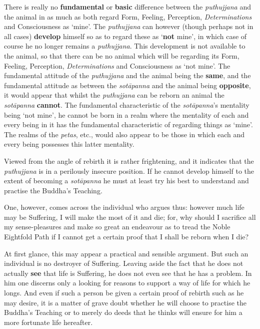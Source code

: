 There is really no \textbf{fundamental} or \textbf{basic} difference between the \emph{puthujjana} and the animal in as much as both regard Form, Feeling, Perception, \emph{Determinations} and Consciousness as `mine'. The \emph{puthujjana} can however (though perhaps not in all cases) \textbf{develop} himself so as to regard these as `\textbf{not} mine', in which case of course he no longer remains a \emph{puthujjana}. This development is not available to the animal, so that there can be no animal which will be regarding its Form, Feeling, Perception, \emph{Determinations} and Consciousness as `not mine'. The fundamental attitude of the \emph{puthujjana} and the animal being the \textbf{same}, and the fundamental attitude as between the \emph{sotāpanna} and the animal being \textbf{opposite}, it would appear that whilst the \emph{puthujjana} can be reborn an animal the \emph{sotāpanna} \textbf{cannot}. The fundamental characteristic of the \emph{sotāpanna}'s mentality being `not mine', he cannot be born in a realm where the mentality of each and every being in it has the fundamental characteristic of regarding things as `mine'. The realms of the \emph{petas}, etc., would also appear to be those in which each and every being possesses this latter mentality.

Viewed from the angle of rebirth it is rather frightening, and it indicates that the \emph{puthujjana} is in a perilously insecure position. If he cannot develop himself to the extent of becoming a \emph{sotāpanna} he must at least try his best to understand and practise the Buddha's Teaching.

One, however, comes across the individual who argues thus: however much life may be Suffering, I will make the most of it and die; for, why should I sacrifice all my sense-pleasures and make so great an endeavour as to tread the Noble Eightfold Path if I cannot get a certain proof that I shall be reborn when I die?

At first glance, this may appear a practical and sensible argument. But such an individual is no destroyer of Suffering. Leaving aside the fact that he does not actually \textbf{see} that life is Suffering, he does not even see that he has a problem. In him one discerns only a looking for reasons to support a way of life for which he longs. And even if such a person be given a certain proof of rebirth such as he may desire, it is a matter of grave doubt whether he will choose to practise the Buddha's Teaching or to merely do deeds that he thinks will ensure for him a more fortunate life hereafter.

